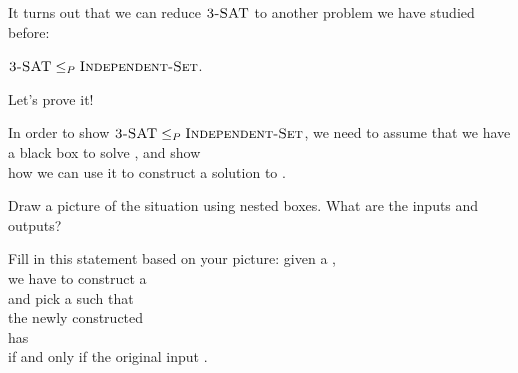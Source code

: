 \documentclass{tufte-handout}
\begin{document}
\pause

It turns out that we can reduce $\textsc{3-SAT}$ to another problem we
have studied before:

\begin{thm}
  $\textsc{3-SAT} \leq_P \textsc{Independent-Set}$.
\end{thm}

\noindent Let's prove it! 

\begin{questions}
\item In order to show
  $\textsc{3-SAT} \leq_P \textsc{Independent-Set}$, we need to assume that we
  have a black box to solve \blank, and show\\ how we can use it to
  construct a solution to \blank.
\item Draw a picture of the situation using nested boxes.  What are
  the inputs and outputs?
\item Fill in this statement based on your picture: given a \blank,\\ we
  have to construct a \blank\\ and pick a \blank such that\\ the newly constructed \blank\\
  has \blank\\ if and only if the original input \blank.
\end{questions}
\end{document}
